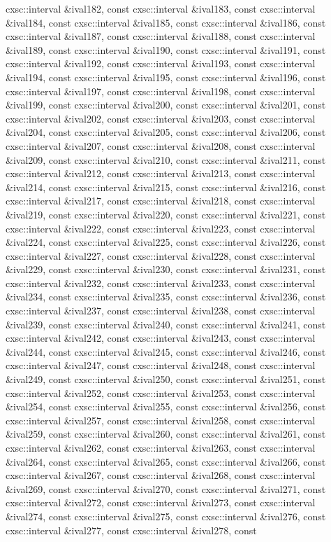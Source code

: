\begin{DoxyCompactItemize}
cxsc\-::interval \&ival182, const cxsc\-::interval \&ival183, const cxsc\-::interval \&ival184, const cxsc\-::interval \&ival185, const cxsc\-::interval \&ival186, const cxsc\-::interval \&ival187, const cxsc\-::interval \&ival188, const cxsc\-::interval \&ival189, const cxsc\-::interval \&ival190, const cxsc\-::interval \&ival191, const cxsc\-::interval \&ival192, const cxsc\-::interval \&ival193, const cxsc\-::interval \&ival194, const cxsc\-::interval \&ival195, const cxsc\-::interval \&ival196, const cxsc\-::interval \&ival197, const cxsc\-::interval \&ival198, const cxsc\-::interval \&ival199, const cxsc\-::interval \&ival200, const cxsc\-::interval \&ival201, const cxsc\-::interval \&ival202, const cxsc\-::interval \&ival203, const cxsc\-::interval \&ival204, const cxsc\-::interval \&ival205, const cxsc\-::interval \&ival206, const cxsc\-::interval \&ival207, const cxsc\-::interval \&ival208, const cxsc\-::interval \&ival209, const cxsc\-::interval \&ival210, const cxsc\-::interval \&ival211, const cxsc\-::interval \&ival212, const cxsc\-::interval \&ival213, const cxsc\-::interval \&ival214, const cxsc\-::interval \&ival215, const cxsc\-::interval \&ival216, const cxsc\-::interval \&ival217, const cxsc\-::interval \&ival218, const cxsc\-::interval \&ival219, const cxsc\-::interval \&ival220, const cxsc\-::interval \&ival221, const cxsc\-::interval \&ival222, const cxsc\-::interval \&ival223, const cxsc\-::interval \&ival224, const cxsc\-::interval \&ival225, const cxsc\-::interval \&ival226, const cxsc\-::interval \&ival227, const cxsc\-::interval \&ival228, const cxsc\-::interval \&ival229, const cxsc\-::interval \&ival230, const cxsc\-::interval \&ival231, const cxsc\-::interval \&ival232, const cxsc\-::interval \&ival233, const cxsc\-::interval \&ival234, const cxsc\-::interval \&ival235, const cxsc\-::interval \&ival236, const cxsc\-::interval \&ival237, const cxsc\-::interval \&ival238, const cxsc\-::interval \&ival239, const cxsc\-::interval \&ival240, const cxsc\-::interval \&ival241, const cxsc\-::interval \&ival242, const cxsc\-::interval \&ival243, const cxsc\-::interval \&ival244, const cxsc\-::interval \&ival245, const cxsc\-::interval \&ival246, const cxsc\-::interval \&ival247, const cxsc\-::interval \&ival248, const cxsc\-::interval \&ival249, const cxsc\-::interval \&ival250, const cxsc\-::interval \&ival251, const cxsc\-::interval \&ival252, const cxsc\-::interval \&ival253, const cxsc\-::interval \&ival254, const cxsc\-::interval \&ival255, const cxsc\-::interval \&ival256, const cxsc\-::interval \&ival257, const cxsc\-::interval \&ival258, const cxsc\-::interval \&ival259, const cxsc\-::interval \&ival260, const cxsc\-::interval \&ival261, const cxsc\-::interval \&ival262, const cxsc\-::interval \&ival263, const cxsc\-::interval \&ival264, const cxsc\-::interval \&ival265, const cxsc\-::interval \&ival266, const cxsc\-::interval \&ival267, const cxsc\-::interval \&ival268, const cxsc\-::interval \&ival269, const cxsc\-::interval \&ival270, const cxsc\-::interval \&ival271, const cxsc\-::interval \&ival272, const cxsc\-::interval \&ival273, const cxsc\-::interval \&ival274, const cxsc\-::interval \&ival275, const cxsc\-::interval \&ival276, const cxsc\-::interval \&ival277, const cxsc\-::interval \&ival278, const 
\end{DoxyCompactItemize}
